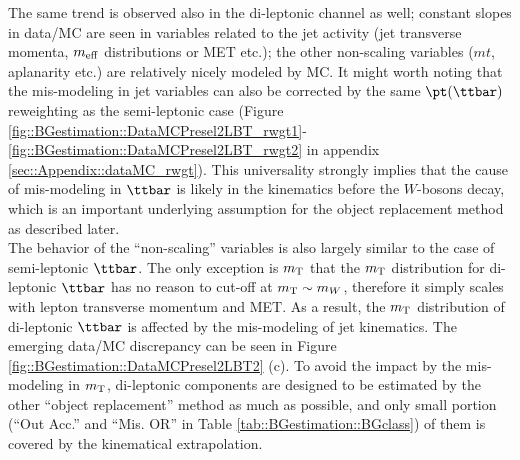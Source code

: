 The same trend is observed also in the di-leptonic channel as well; constant slopes in data/MC are seen in variables related to the jet activity (jet transverse momenta, $m_{\mathrm{eff}}$ distributions or MET etc.); the other non-scaling variables ($mt$, aplanarity etc.) are relatively nicely modeled by MC. 
\noindent It might worth noting that the mis-modeling in jet variables can also be corrected by the same $\ttPt$ reweighting as the semi-leptonic case (Figure \ref{fig::BGestimation::DataMCPresel2LBT_rwgt1}-\ref{fig::BGestimation::DataMCPresel2LBT_rwgt2} in appendix \ref{sec::Appendix::dataMC_rwgt}).
This universality strongly implies that the cause of mis-modeling in $\ttbar$ is likely in the kinematics before the $W$-bosons decay, which is an important underlying assumption for the object replacement method as described later. \\
The behavior of the ``non-scaling'' variables is also largely similar to the case of semi-leptonic $\ttbar$. The only exception is $m_{\mathrm{T}}$ that the  $m_{\mathrm{T}}$ distribution for di-leptonic $\ttbar$ has no reason to cut-off at $m_{\mathrm{T}} \sim m_W$, therefore it simply scales with lepton transverse momentum and MET. As a result, the $m_{\mathrm{T}}$ distribution of di-leptonic $\ttbar$ is affected by the mis-modeling of jet kinematics. The emerging data/MC discrepancy can be seen in Figure \ref{fig::BGestimation::DataMCPresel2LBT2} (c). To avoid the impact by the mis-modeling in $m_{\mathrm{T}}$, di-leptonic components are designed to be estimated by the other ``object replacement'' method as much as possible, and only small portion (``Out Acc.'' and ``Mis. OR'' in Table \ref{tab::BGestimation::BGclass}) of them is covered by the kinematical extrapolation. \\



